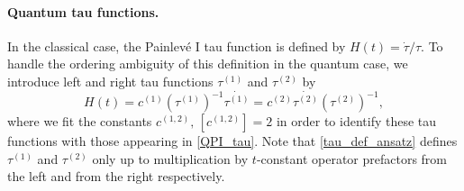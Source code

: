\documentclass[12pt,a4paper]{article}
\numberwithin{equation}{section}
\begin{document}
\paragraph{Quantum tau functions.}
In the classical case, the Painlev\'e I tau function is defined by $H(t)=\dot{\tau}/\tau$. To handle the ordering ambiguity of this definition in the quantum case, we introduce left and right tau functions $\tau^{(1)}$ and $\tau^{(2)}$ by
\begin{equation}\label{tau_def_ansatz}
H(t)=c^{(1)}\left(\tau^{(1)}\right)^{-1}\dot{\tau^{(1)}}=c^{(2)}\dot{\tau^{(2)}}\left(\tau^{(2)}\right)^{-1},
\end{equation}
where we fit the constants $c^{(1,2)},\, [c^{(1,2)}]=2$ in order to identify these tau functions with those appearing in \eqref{QPI_tau}. Note that \eqref{tau_def_ansatz} defines $\tau^{(1)}$ and $\tau^{(2)}$ only up to multiplication by $t$-constant operator prefactors from the left and from the right respectively.
\end{document}
